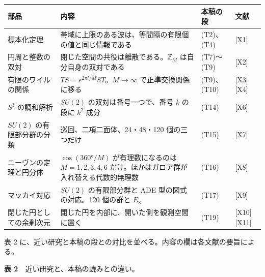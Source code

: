 \documentclass[
  a4paper,
]{ltjsarticle}
\newcounter{none} %
\begin{document}
{\def\LTcaptype{none} %
\begin{longtable}[]{@{}
  >{\raggedright\arraybackslash}p{}
  >{\raggedright\arraybackslash}p{}
  >{\raggedright\arraybackslash}p{}
  >{\raggedright\arraybackslash}p{}@{}}
\toprule\noalign{}
\begin{minipage}[b]{\linewidth}\raggedright
部品
\end{minipage} & \begin{minipage}[b]{\linewidth}\raggedright
内容
\end{minipage} & \begin{minipage}[b]{\linewidth}\raggedright
本稿の段
\end{minipage} & \begin{minipage}[b]{\linewidth}\raggedright
文献
\end{minipage} \\
\midrule\noalign{}
\endhead
\bottomrule\noalign{}
\endlastfoot
標本化定理 & 帯域に上限のある波は、等間隔の有限個の値と同じ情報である &
(T2)、(T4) & {[}X1{]} \\
円周と整数の双対 & 閉じた空間の共役は離散である。\(\mathbb{Z}_M\)
は自分自身の双対である & (T7)〜(T9) & {[}X2{]} \\
有限のワイルの関係 & \(TS=e^{2\pi i/M}ST\)。\(M\to\infty\)
で正準交換関係に移る & (T9)、(T10) & {[}X3{]} {[}X4{]} \\
\(S^3\) の調和解析 & \(SU(2)\) の双対は番号一つで、番号 \(k\) の段に
\(k^2\) 成分 & (T14) & {[}X6{]} \\
\(SU(2)\) の有限部分群の分類 & 巡回、二項二面体、24・48・120
個の三つだけ & (T15) & {[}X7{]} \\
ニーヴンの定理と円分体 & \(\cos(360°/M)\) が有理数になるのは
\(M=1,2,3,4,6\) だけ。ほかはガロア群が入れ替える代数的無理数 & (T16) &
{[}X8{]} \\
マッカイ対応 & \(SU(2)\) の有限部分群と ADE 型の図式の対応。120 個の群と
\(E_8\) & (T17) & {[}X9{]} \\
閉じた円としての余剰次元 & 閉じた円を内部に、開いた側を観測空間に置く &
(T19) & {[}X10{]} {[}X11{]} \\
\end{longtable}
}

表 2
に、近い研究と本稿の段との対比を並べる。内容の欄は各文献の要旨による。

\textbf{表 2}　近い研究と、本稿の読みとの違い。
\end{document}
